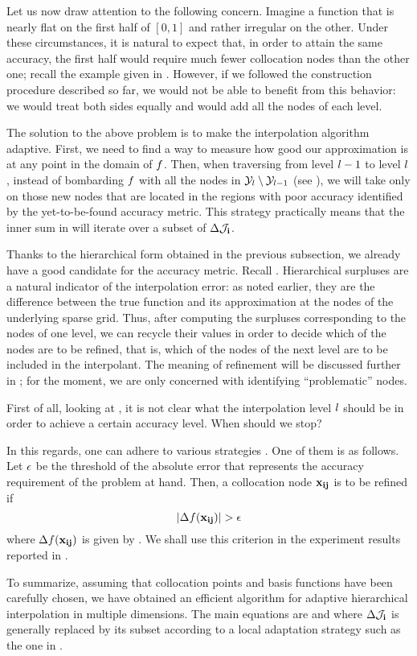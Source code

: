 Let us now draw attention to the following concern. Imagine a function that is
nearly flat on the first half of $[0, 1]$ and rather irregular on the other.
Under these circumstances, it is natural to expect that, in order to attain the
same accuracy, the first half would require much fewer collocation nodes than
the other one; recall the example given in . However, if we
followed the construction procedure described so far, we would not be able to
benefit from this behavior: we would treat both sides equally and would add all
the nodes of each level.

The solution to the above problem is to make the interpolation algorithm
adaptive. First, we need to find a way to measure how good our approximation is
at any point in the domain of $f$. Then, when traversing from level $l - 1$ to
level $l$, instead of bombarding $f$ with all the nodes in $\mathcal{Y}_l \setminus
\mathcal{Y}_{l - 1}$ (see ), we will take only on those
new nodes that are located in the regions with poor accuracy identified by the
yet-to-be-found accuracy metric. This strategy practically means that the inner
sum in  will iterate over a subset of
$\Delta\mathcal{J}_{\mathbf{i}}$.

Thanks to the hierarchical form obtained in the previous subsection, we already
have a good candidate for the accuracy metric. Recall .
Hierarchical surpluses are a natural indicator of the interpolation error: as
noted earlier, they are the difference between the true function and its
approximation at the nodes of the underlying sparse grid. Thus, after computing
the surpluses corresponding to the nodes of one level, we can recycle their
values in order to decide which of the nodes are to be refined, that is, which
of the nodes of the next level are to be included in the interpolant. The
meaning of refinement will be discussed further in ; for
the moment, we are only concerned with identifying ``problematic'' nodes.

First of all, looking at , it is not clear what the
interpolation level $l$ should be in order to achieve a certain accuracy level.
When should we stop?

In this regards, one can adhere to various strategies \cite{ma2009}. One of them
is as follows. Let $\epsilon$ be the threshold of the absolute error that
represents the accuracy requirement of the problem at hand. Then, a collocation
node $\mathbf{x}_{\mathbf{i}\mathbf{j}}$ is to be refined if
\begin{equation} \elab{error}
  \left| \surplus(\vx_{\vi\vj}) \right| > \error
\end{equation}
where $\Delta f(\mathbf{x}_{\mathbf{i}\mathbf{j}})$ is given by . We shall use this
criterion in the experiment results reported in .

To summarize, assuming that collocation points and basis functions have been
carefully chosen, we have obtained an efficient algorithm for adaptive
hierarchical interpolation in multiple dimensions. The main equations are
 and  where $\Delta\mathcal{J}_{\mathbf{i}}$ is
generally replaced by its subset according to a local adaptation strategy such
as the one in .

